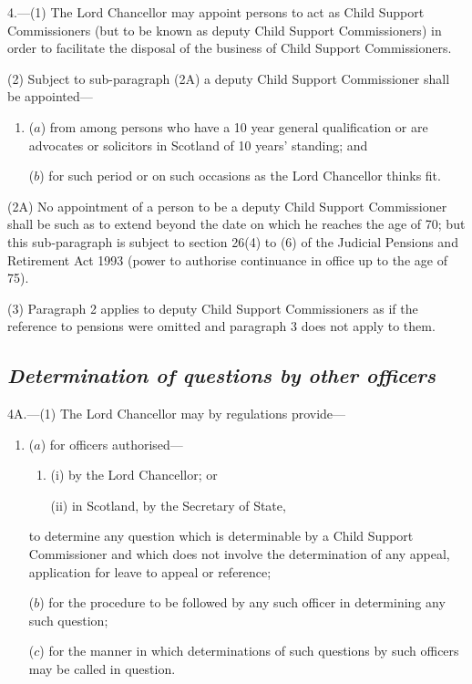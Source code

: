 \documentclass[12pt,a4paper]{article}
\begin{document}
4.---(1) The Lord Chancellor may appoint persons to act as Child Support Commissioners (but to be known as deputy Child Support Commissioners) in order to facilitate the disposal of the business of Child Support Commissioners.

(2) 
Subject to sub-paragraph (2A)  %
a deputy Child Support Commissioner shall be appointed—
\begin{enumerate}\item[]
($a$) from among persons who have a 10 year general qualification or are advocates or solicitors in Scotland of 10 years' standing; and

($b$) for such period or on such occasions as the Lord Chancellor thinks fit.
\end{enumerate}

(2A) No appointment of a person to be a deputy Child Support Commissioner shall be such as to extend beyond the date on which he reaches the age of 70; but this sub-paragraph is subject to section 26(4) to (6) of the Judicial Pensions and Retirement Act 1993 (power to authorise continuance in office up to the age of 75).

(3) Paragraph 2 applies to deputy Child Support Commissioners as if the reference to pensions were omitted and paragraph 3 does not apply to them.


\subsection*{\itshape Determination of questions by other officers}

4A.---(1) The Lord Chancellor may by regulations provide—
\begin{enumerate}\item[]
($a$) for officers authorised—
\begin{enumerate}\item[]
(i) by the Lord Chancellor; or

(ii) in Scotland, by the Secretary of State,
\end{enumerate}
to determine any question which is determinable by a Child Support Commissioner and which does not involve the determination of any appeal, application for leave to appeal or reference;

($b$) for the procedure to be followed by any such officer in determining any such question;

($c$) for the manner in which determinations of such questions by such officers may be called in question.
\end{enumerate}
\end{document}
